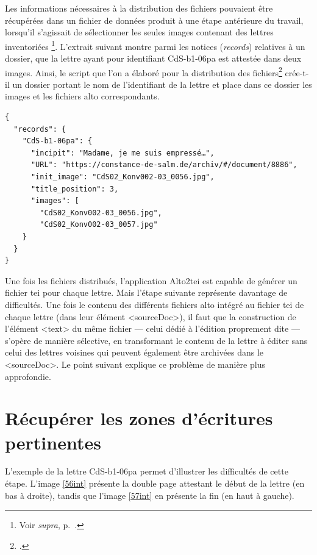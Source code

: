 \documentclass[a4paper,12pt,twoside]{book}
\begin{document}
			Les informations nécessaires à la distribution des fichiers pouvaient être récupérées dans un fichier de données produit à une étape antérieure du travail, lorsqu'il s'agissait de sélectionner les seules images contenant des lettres inventoriées%
			\footnote{Voir \textit{supra}, p.~\pageref{donnees-images}.}.
			L'extrait suivant montre parmi les notices (\textit{records}) relatives à un dossier, que la lettre ayant pour identifiant \textsf{CdS-b1-06pa} est attestée dans deux images. Ainsi, le script que l'on a élaboré pour la distribution des fichiers\footcite{biayDistributionFichiersPy2022} crée-t-il un dossier portant le nom de l'identifiant de la lettre et place dans ce dossier les images et les fichiers \gls{alto} correspondants.
			
			\label{json-CdS-b1-06pa}
			\begin{verbatim}
{
  "records": {
    "CdS-b1-06pa": {
      "incipit": "Madame, je me suis empressé…",
      "URL": "https://constance-de-salm.de/archiv/#/document/8886",
      "init_image": "CdS02_Konv002-03_0056.jpg",
      "title_position": 3,
      "images": [
        "CdS02_Konv002-03_0056.jpg",
        "CdS02_Konv002-03_0057.jpg"
    }
  }
}
			\end{verbatim}
			
			Une fois les fichiers distribués, l'application Alto2tei est capable de générer un fichier \gls{tei} pour chaque lettre. Mais l'étape suivante représente davantage de difficultés. Une fois le contenu des différents fichiers \gls{alto} intégré au fichier \gls{tei} de chaque lettre (dans leur élément \textsf{<sourceDoc>}), il faut que la construction de l'élément \textsf{<text>} du même fichier --- celui dédié à l'édition proprement dite --- s'opère de manière sélective, en transformant le contenu de la lettre à éditer sans celui des lettres voisines qui peuvent également être archivées dans le \textsf{<sourceDoc>}. Le point suivant explique ce problème de manière plus approfondie.
			
		\section{Récupérer les zones d'écritures pertinentes}
		
			L'exemple de la lettre \textsf{CdS-b1-06pa} permet d'illustrer les difficultés de cette étape. L'image \ref{56int} présente la double page attestant le début de la lettre (en bas à droite), tandis que l'image \ref{57int} en présente la fin (en haut à gauche).
			
\end{document}
